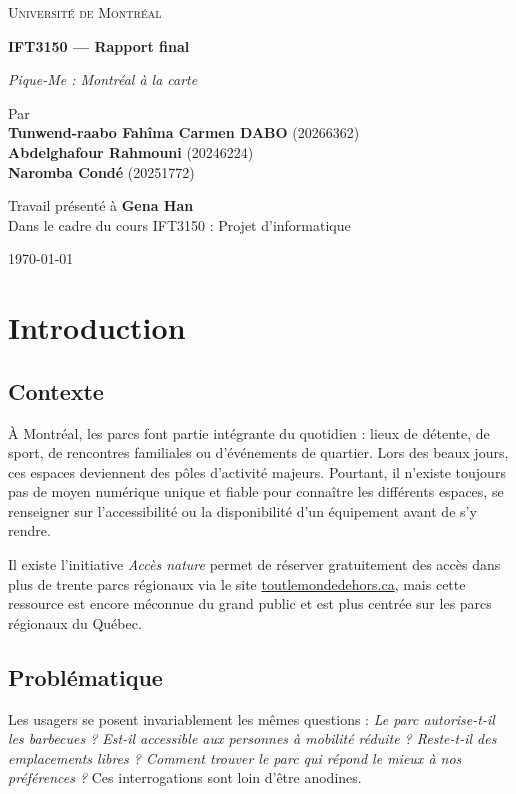 \documentclass[12pt,a4paper]{article}
\newcommand{\university}{\textsc{Université de Montréal}}
\newcommand{\mainTitle}{\textbf{IFT3150 — Rapport final}}
\newcommand{\projectSubtitle}{\large\emph{Pique-Me :  Montréal à la carte}}
\newcommand{\authorsBlock}{%
  Par\\[0.75em]
  \textbf{Tunwend-raabo Fahîma Carmen DABO } (20266362)\\
  \textbf{Abdelghafour Rahmouni} (20246224)\\
  \textbf{Naromba Condé} (20251772)
}
\newcommand{\presentedTo}{Travail présenté à \textbf{Gena Han}\\[0.25em]
Dans le cadre du cours IFT3150 : Projet d'informatique}
\newcommand{\dateBlock}{\today}
\begin{document}

\begin{titlepage}
  \centering
  \vspace*{1.5cm}
  {\Large \university\par}
  \vfill
  {\Large \mainTitle\par}
  \vspace{0.75cm}
  {\projectSubtitle\par}
  \vfill
  {\authorsBlock\par}
  \vfill
  {\presentedTo\par}
  \vspace{0.75cm}
  {\dateBlock\par}
\end{titlepage}

\clearpage
\tableofcontents
\clearpage
{}

\section{Introduction}

\subsection*{Contexte}
À Montréal, les parcs font partie intégrante du quotidien : lieux de détente,
de sport, de rencontres familiales ou d'événements de quartier.
Lors des beaux jours, ces espaces deviennent des pôles d'activité
majeurs. Pourtant, il n'existe toujours pas de moyen numérique unique
et fiable pour connaître les différents espaces, se renseigner sur l'accessibilité ou la
disponibilité d'un équipement avant de s'y rendre.

Il existe l'initiative \textit{Accès nature} permet de 
réserver gratuitement des accès dans plus de trente parcs régionaux via le site \href{https://www.parq.ca/ressources/acces-nature}{toutlemondedehors.ca}, 
mais cette ressource est encore méconnue du grand public et est plus centrée sur les parcs régionaux du Québec.

\subsection*{Problématique}
Les usagers se posent invariablement les mêmes questions :
\textit{Le parc autorise-t-il les barbecues ? Est-il accessible aux personnes à mobilité réduite ?
Reste-t-il des emplacements libres ? Comment trouver le parc qui répond le mieux à nos préférences ?}  
Ces interrogations sont loin d'être anodines. 
\end{document}
